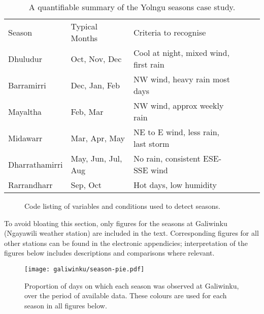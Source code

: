 \begin{table}[h]
    \centering
    \begin{tabular}{llllll}
        Season          &  Typical Months       &  Criteria to recognise                    \\
        Dhuludur        &  Oct, Nov, Dec        &  Cool at night, mixed wind, first rain    \\
        Barramirri      &  Dec, Jan, Feb        &  NW wind, heavy rain most days            \\
        Mayaltha        &  Feb, Mar             &  NW wind, approx weekly rain              \\
        Midawarr        &  Mar, Apr, May        &  NE to E wind, less rain, last storm      \\
        Dharrathamirri  &  May, Jun, Jul, Aug   &  No rain, consistent ESE-SSE wind         \\
        Rarrandharr     &  Sep, Oct             &  Hot days, low humidity
    \end{tabular}
    \caption[A quantifiable summary of the Yolngu seasons case study]{
        A quantifiable summary of the Yolngu seasons case study.}
    \label{tab:quant-seasons-summary}
\end{table}

\begin{figure}[h]
    
    \centering
    \caption[Python code: definition of season indicies]{
        Code listing of variables and conditions used to detect seasons.
        }
    \label{fig:season-definitions-code}
\end{figure}

To avoid bloating this section, only figures for the seasons at Galiwinku
(Ngayawili weather station) are included in the text.  Corresponding
figures for all other stations can be found in the electronic appendicies;
interpretation of the figures below includes descriptions and comparisons
where relevant.

\begin{wrapfigure}{R}{0.5\textwidth}
    \centering
    \texttt{[image: galiwinku/season-pie.pdf]}
    \caption[Calculated season frequency, Galiwinku]{
        Proportion of days on which each season was observed at
        Galiwinku, over the period of available data.
        These colours are used for each season in all figures below.
        }
    \label{fig:galiwinku-season-pie}
\end{wrapfigure}

